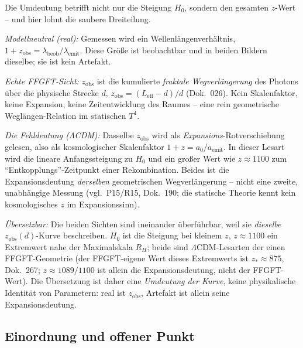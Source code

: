Die Umdeutung betrifft nicht nur die Steigung $H_0$, sondern den gesamten
$z$-Wert -- und hier lohnt die saubere Dreiteilung.

\emph{Modellneutral (real):} Gemessen wird ein Wellenlängenverhältnis,
$1+z_{\text{obs}} = \lambda_{\text{beob}}/\lambda_{\text{emit}}$. Diese Größe
ist beobachtbar und in beiden Bildern dieselbe; sie ist kein Artefakt.

\emph{Echte FFGFT-Sicht:} $z_{\text{obs}}$ ist die kumulierte \emph{fraktale
Wegverlängerung} des Photons über die physische Strecke $d$,
$z_{\text{obs}} = (L_{\text{eff}}-d)/d$ (Dok.~026). Kein Skalenfaktor, keine
Expansion, keine Zeitentwicklung des Raumes -- eine rein geometrische
Weglängen-Relation im statischen $T^4$.

\emph{Die Fehldeutung ($\Lambda$CDM):} Dasselbe $z_{\text{obs}}$ wird als
\emph{Expansions}-Rotverschiebung gelesen, also als kosmologischer Skalenfaktor
$1+z = a_0/a_{\text{emit}}$. In dieser Lesart wird die lineare Anfangssteigung
zu $H_0$ und ein großer Wert wie $z\approx 1100$ zum \enquote{Entkopplungs}-Zeitpunkt
einer Rekombination. Beides ist die Expansionsdeutung \emph{derselben}
geometrischen Wegverlängerung -- nicht eine zweite, unabhängige Messung
(vgl.\ P15/R15, Dok.~190; die statische Theorie kennt kein kosmologisches $z$
im Expansionssinn).

\emph{Übersetzbar:} Die beiden Sichten sind ineinander überführbar, weil sie
\emph{dieselbe} $z_{\text{obs}}(d)$-Kurve beschreiben. $H_0$ ist die Steigung
bei kleinem $z$, $z\approx 1100$ ein Extremwert nahe der Maximalskala $R_H$;
beide sind $\Lambda$CDM-Lesarten der einen FFGFT-Geometrie (der FFGFT-eigene
Wert dieses Extremwerts ist $z_*\approx 875$, Dok.~267; $z\approx 1089/1100$ ist
allein die Expansionsdeutung, nicht der FFGFT-Wert). Die Übersetzung
ist daher eine \emph{Umdeutung der Kurve}, keine physikalische Identität von
Parametern: real ist $z_{\text{obs}}$, Artefakt ist allein seine
Expansionsdeutung.

\subsection*{Einordnung und offener Punkt}


